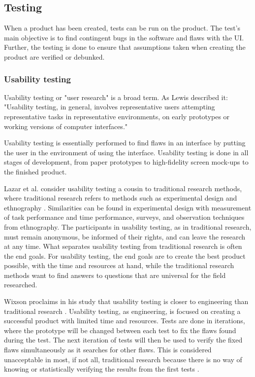 \subsection{Testing}%
\label{sub:Testing}
When a product has been created, tests can be run on the product. The test's main objective is to find contingent bugs in the software and flaws with the UI. Further, the testing is done to ensure that assumptions taken when creating the product are verified or debunked.

\subsubsection{Usability testing}%
\label{ssub:User testing}
Usability testing or "user research" is a broad term. As Lewis  described it: "Usability testing, in general, involves representative users attempting representative tasks in representative environments, on early prototypes or working versions of computer interfaces." \cite{lewis2006usability} 

Usability testing is essentially performed to find flaws in an interface by putting the user in the environment of using the interface. Usability testing is done in all stages of development, from paper prototypes to high-fidelity screen mock-ups to the finished product. 

Lazar et al. \cite[Chapter~10]{lazar2017research}  consider usability testing a cousin to traditional research methods, where traditional research refers to methods such as experimental design \cite[Chapter~3]{lazar2017research}  and ethnography \cite[Chapter~9]{lazar2017research}.
Similarities can be found in experimental design with measurement of task performance and time performance, surveys, and observation techniques from ethnography. The participants in usability testing, as in traditional research, must remain anonymous, be informed of their rights, and can leave the research at any time. What separates usability testing from traditional research is often the end goals. For usability testing, the end goals are to create the best product possible, with the time and resources at hand, while the traditional research methods want to find answers to questions that are universal for the field researched. 
	
Wixson proclaims in his study that usability testing is closer to engineering than traditional research \cite{wixon2003evaluating}. Usability testing, as engineering, is focused on creating a successful product with limited time and resources. Tests are done in iterations, where the prototype will be changed between each test to fix the flaws found during the test. The next iteration of tests will then be used to verify the fixed flaws simultaneously as it searches for other flaws. This is considered unacceptable in most, if not all, traditional research because there is no way of knowing or statistically verifying the results from the first tests \cite{lazar2017research}.  

